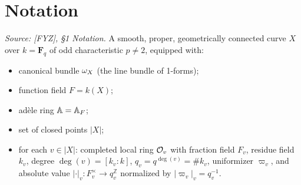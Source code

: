 \section{Notation}

\begin{definition}
  \label{def:base-curve}
  \textit{Source: [FYZ], \S1 Notation.}
  A smooth, proper, geometrically connected curve \(X\) over \(k = \mathbf{F}_q\) of
  odd characteristic \(p \neq 2\), equipped with:
  \begin{itemize}
    \item canonical bundle \(\omega_X\) (the line bundle of 1-forms);
    \item function field \(F = k(X)\);
    \item adèle ring \(\mathbb{A} = \mathbb{A}_F\);
    \item set of closed points \(|X|\);
    \item for each \(v \in |X|\): completed local ring \(\mathcal{O}_v\) with fraction field
      \(F_v\), residue field \(k_v\), degree \(\deg(v) = [k_v:k]\),
      \(q_v = q^{\deg(v)} = \#k_v\), uniformizer \(\varpi_v\), and absolute value
      \(|\cdot|_v : F_v^\times \to q_v^{\mathbb{Z}}\) normalized by
      \(|\varpi_v|_v = q_v^{-1}\).
  \end{itemize}
\end{definition}

